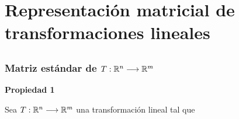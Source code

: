 \section{Representación matricial de transformaciones lineales}

\subsection{}

{\nologo
\begin{frame}\frametitle{Matriz estándar de $T:\mathbb{R}^n\longrightarrow\mathbb{R}^m$}

\vspace{-1mm}
\begin{prop}{\textbf{Propiedad 1}}
	\justifying
	
	Sea $T:\mathbb{R}^n\longrightarrow\mathbb{R}^m$ una transformación lineal tal que
    

\end{prop}
\end{frame}}
